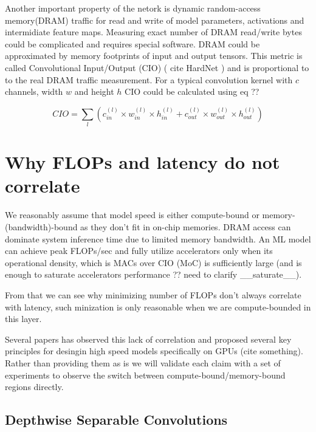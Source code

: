 Another important property of the netork is dynamic random-access memory(DRAM) traffic for read and write of model parameters, activations and intermidiate feature maps. Measuring exact number of DRAM read/write bytes could be complicated and requires special software. DRAM could be approximated by memory footprints of input and output tensors. This metric is called Convolutional Input/Output (CIO) ( cite HardNet ) and is proportional to to the real DRAM traffic measurement. For a typical convolution kernel with $c$ channels, width $w$ and height $h$ CIO could be calculated using eq ??

$$
C I O=\sum_{l}\left(c_{i n}^{(l)} \times w_{i n}^{(l)} \times h_{i n}^{(l)}+c_{o u t}^{(l)} \times w_{o u t}^{(l)} \times h_{o u t}^{(l)}\right)
$$



\section{Why FLOPs and latency do not correlate}

We reasonably assume that model speed is either compute-bound or memory-(bandwidth)-bound as they don't fit in on-chip memories. DRAM access can dominate system inference time due to limited memory bandwidth. An ML model can achieve peak FLOPs/sec and fully utilize accelerators only when its operational density, which is MACs over CIO (MoC) is sufficiently large (and is enough to saturate accelerators performance ?? need to clarify __saturate__). 


From that we can see why minimizing number of FLOPs don't always correlate with latency, such minization is only reasonable when we are compute-bounded in this layer. 

Several papers has observed this lack of correlation and proposed several key principles for desingin high speed models specifically on GPUs (cite something). Rather than providing them as is we will validate each claim with a set of experiments to observe the switch between compute-bound/memory-bound regions directly.

\subsection{Depthwise Separable Convolutions}

